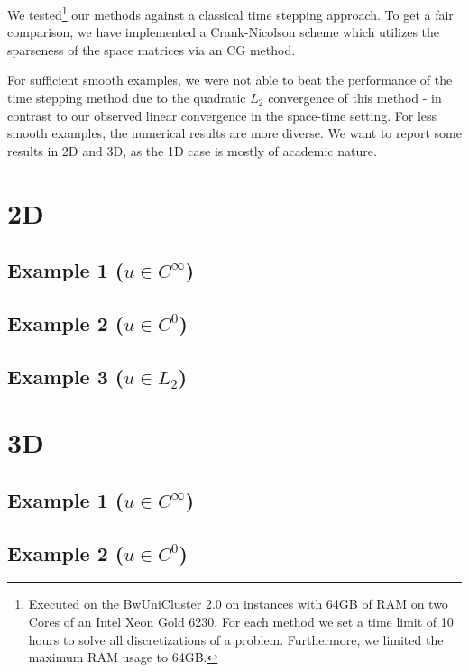 \documentclass{article}
\begin{document}
We tested\footnote{Executed on the BwUniCluster 2.0 on instances with 64GB of RAM on two Cores of an Intel Xeon Gold 6230. For each method we set a time limit of 10 hours to solve all discretizations of a problem. Furthermore, we limited the maximum RAM usage to 64GB. } our methods against a classical time stepping approach. To get a fair comparison, we have implemented a Crank-Nicolson scheme which utilizes the sparseness of the space matrices via an CG method. 

For sufficient smooth examples, we were not able to beat the performance of the time stepping method due to the quadratic $L_2$ convergence of this method - in contrast to our observed linear convergence in the space-time setting. For less smooth examples, the numerical results are more diverse. We want to report some results in 2D and 3D, as the 1D case is mostly of academic nature.

\scriptsize
\section*{2D}
\subsection*{Example 1 ($u \in C^\infty$)}


\subsection*{Example 2 ($u \in C^0$)}


\subsection*{Example 3 ($u \in L_2$)}


\newpage
\section*{3D}
\subsection*{Example 1 ($u \in C^\infty$)}


\subsection*{Example 2 ($u \in C^0$)}

\end{document}
